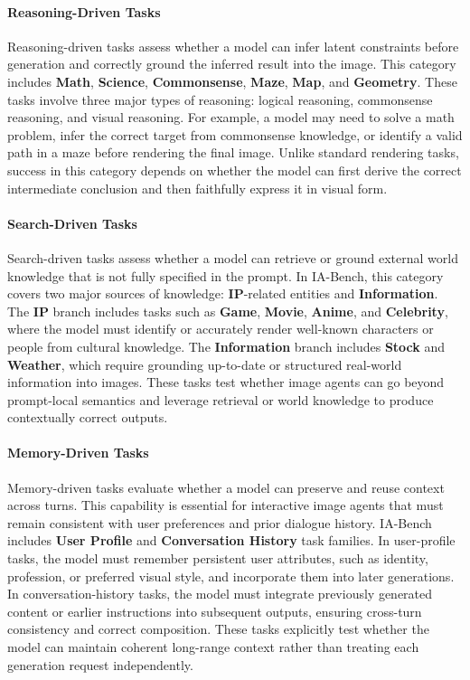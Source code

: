 \documentclass{llmxive}
\begin{document}
\paragraph{Reasoning-Driven Tasks}
Reasoning-driven tasks assess whether a model can infer latent constraints before generation and correctly ground the inferred result into the image. This category includes \textbf{Math}, \textbf{Science}, \textbf{Commonsense}, \textbf{Maze}, \textbf{Map}, and \textbf{Geometry}. These tasks involve three major types of reasoning: logical reasoning, commonsense reasoning, and visual reasoning. For example, a model may need to solve a math problem, infer the correct target from commonsense knowledge, or identify a valid path in a maze before rendering the final image. Unlike standard rendering tasks, success in this category depends on whether the model can first derive the correct intermediate conclusion and then faithfully express it in visual form.

\paragraph{Search-Driven Tasks}
Search-driven tasks assess whether a model can retrieve or ground external world knowledge that is not fully specified in the prompt. In IA-Bench, this category covers two major sources of knowledge: \textbf{IP}-related entities and \textbf{Information}. The \textbf{IP} branch includes tasks such as \textbf{Game}, \textbf{Movie}, \textbf{Anime}, and \textbf{Celebrity}, where the model must identify or accurately render well-known characters or people from cultural knowledge. The \textbf{Information} branch includes \textbf{Stock} and \textbf{Weather}, which require grounding up-to-date or structured real-world information into images. These tasks test whether image agents can go beyond prompt-local semantics and leverage retrieval or world knowledge to produce contextually correct outputs.

\paragraph{Memory-Driven Tasks}
Memory-driven tasks evaluate whether a model can preserve and reuse context across turns. This capability is essential for interactive image agents that must remain consistent with user preferences and prior dialogue history. IA-Bench includes \textbf{User Profile} and \textbf{Conversation History} task families. In user-profile tasks, the model must remember persistent user attributes, such as identity, profession, or preferred visual style, and incorporate them into later generations. In conversation-history tasks, the model must integrate previously generated content or earlier instructions into subsequent outputs, ensuring cross-turn consistency and correct composition. These tasks explicitly test whether the model can maintain coherent long-range context rather than treating each generation request independently.
\end{document}
